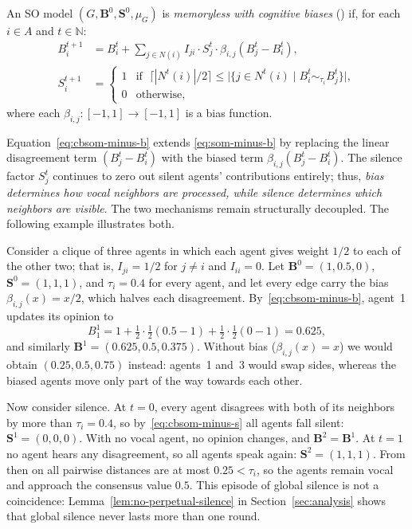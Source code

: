 \begin{definition}[\CBSOMminus]\label{def:cbsom-minus}
  An SO model $(G,\mathbf{B}^0,\mathbf{S}^0,\mu_G)$ is
  \emph{memoryless with cognitive biases} (\CBSOMminus) if,
  for each $i\in A$ and $t\in\mathbb{N}$:
  \begin{align}
    B_i^{t+1} &= B_i^t
      + \sum_{j\in N(i)} I_{ji}\cdot S_j^t
        \cdot\beta_{i,j}(B_j^t - B_i^t),
    \label{eq:cbsom-minus-b}\\
    S_i^{t+1} &=
    \begin{cases}
      1 & \text{if }\;\bigl\lceil|N^t(i)|/2\bigr\rceil
          \le\bigl|\{j\in N^t(i)\mid
            B_i^t\sim_{\tau_i}B_j^t\}\bigr|,\\
      0 & \text{otherwise,}
    \end{cases}
    \label{eq:cbsom-minus-s}
  \end{align}
  where each $\beta_{i,j}:[-1,1]\to[-1,1]$ is a bias function.
\end{definition}

Equation~\eqref{eq:cbsom-minus-b} extends \eqref{eq:som-minus-b}
by replacing the linear disagreement term $(B_j^t-B_i^t)$ with the
biased term $\beta_{i,j}(B_j^t-B_i^t)$. The silence factor $S_j^t$
continues to zero out silent agents' contributions entirely; thus,
\emph{bias determines how vocal neighbors are processed, while
silence determines which neighbors are visible}. The two mechanisms
remain structurally decoupled. The following example illustrates both.

\begin{example}\label{ex:cbsom-minus}
  Consider a clique of three agents in which each agent gives weight
  $1/2$ to each of the other two; that is, $I_{ji}=1/2$ for $j\ne i$ and
  $I_{ii}=0$. Let $\mathbf{B}^0=(1,0.5,0)$, $\mathbf{S}^0=(1,1,1)$, and
  $\tau_i=0.4$ for every agent, and let every edge carry the bias
  $\beta_{i,j}(x)=x/2$, which halves each disagreement.
  By~\eqref{eq:cbsom-minus-b}, agent~1 updates its opinion to
  \[
    B_1^1 = 1+\tfrac{1}{2}\cdot\tfrac{1}{2}(0.5-1)
             +\tfrac{1}{2}\cdot\tfrac{1}{2}(0-1) = 0.625,
  \]
  and similarly $\mathbf{B}^1=(0.625,0.5,0.375)$. Without bias
  ($\beta_{i,j}(x)=x$) we would obtain $(0.25,0.5,0.75)$ instead: agents~1
  and~3 would swap sides, whereas the biased agents move only part of the
  way towards each other.

  Now consider silence. At $t=0$, every agent disagrees with both of its
  neighbors by more than $\tau_i=0.4$, so by~\eqref{eq:cbsom-minus-s} all
  agents fall silent: $\mathbf{S}^1=(0,0,0)$. With no vocal agent, no
  opinion changes, and $\mathbf{B}^2=\mathbf{B}^1$. At $t=1$ no agent hears
  any disagreement, so all agents speak again: $\mathbf{S}^2=(1,1,1)$. From
  then on all pairwise distances are at most $0.25<\tau_i$, so the agents
  remain vocal and approach the consensus value $0.5$. This episode of
  global silence is not a coincidence: Lemma~\ref{lem:no-perpetual-silence}
  in Section~\ref{sec:analysis} shows that global silence never lasts more
  than one round.
\end{example}

